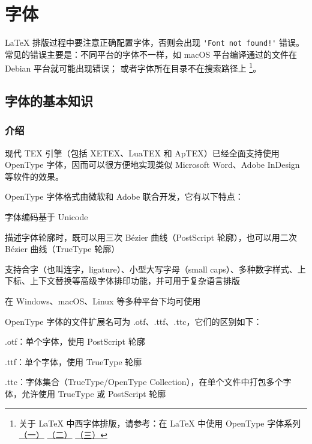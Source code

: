 \chapter{字体}

{\LaTeX} 排版过程中要注意正确配置字体，否则会出现 \verb|'Font not found!'| 错误。
常见的错误主要是：不同平台的字体不一样，如 macOS 平台编译通过的文件在 Debian 平台就可能出现错误；
或者字体所在目录不在搜索路径上
\footnote{
关于 {\LaTeX} 中西字体排版，请参考：在 {\LaTeX} 中使用 OpenType 字体系列
\href{https://stone-zeng.github.io/2018-08-08-use-opentype-fonts}{（一）}
\href{https://stone-zeng.github.io/2019-07-06-use-opentype-fonts-ii}{（二）}
\href{https://stone-zeng.github.io/2020-05-02-use-opentype-fonts-iii/}{（三）}
}。

\section{字体的基本知识}

\subsection{介绍}
现代 TEX 引擎（包括 X⁠E⁠TEX、Lua­TEX 和 Ap­TEX）已经全面支持使用 OpenType 字体，因而可以很方便地实现类似 Microsoft Word、Adobe InDesign 等软件的效果。

OpenType 字体格式由微软和 Adobe 联合开发，它有以下特点：

\begin{compactitems}
  \item 字体编码基于 Unicode
  \item 描述字体轮廓时，既可以用三次 Bézier 曲线（PostScript 轮廓），也可以用二次 Bézier 曲线（TrueType 轮廓）
  \item 支持合字（也叫连字，ligature）、小型大写字母（small caps）、多种数字样式、上下标、上下文替换等高级字体排印功能，并可用于复杂语言排版
  \item 在 Windows、macOS、Linux 等多种平台下均可使用
\end{compactitems}

OpenType 字体的文件扩展名可为 .otf、.ttf、.ttc，它们的区别如下：

\begin{compactitems}
  \item .otf：单个字体，使用 PostScript 轮廓
  \item .ttf：单个字体，使用 TrueType 轮廓
  \item .ttc：字体集合（TrueType/OpenType Collection），在单个文件中打包多个字体，允许使用 TrueType 或 PostScript 轮廓
\end{compactitems}

